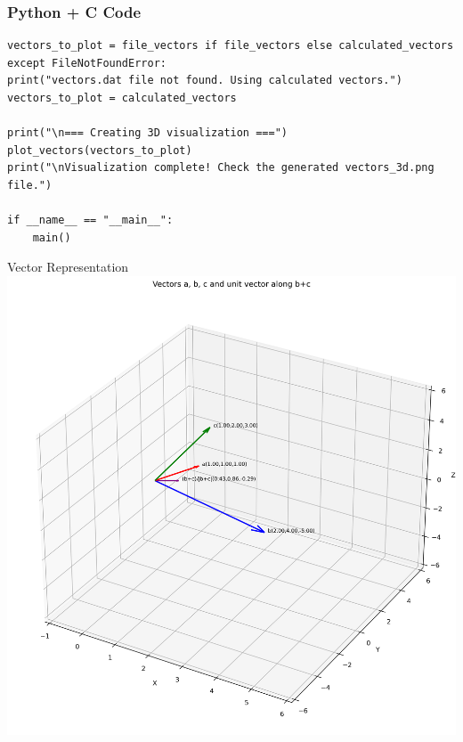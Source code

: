 \documentclass{beamer}
\begin{document}
\begin{frame}[fragile]
    \frametitle{Python + C Code}
    \begin{lstlisting}
vectors_to_plot = file_vectors if file_vectors else calculated_vectors
except FileNotFoundError:
print("vectors.dat file not found. Using calculated vectors.")
vectors_to_plot = calculated_vectors

print("\n=== Creating 3D visualization ===")
plot_vectors(vectors_to_plot)
print("\nVisualization complete! Check the generated vectors_3d.png file.")

if __name__ == "__main__":
    main()
    \end{lstlisting}
\end{frame}


\begin{frame}{Vector Representation}
   \centering
    \includegraphics[width=\columnwidth, height=0.8\textheight, keepaspectratio]{figs/fig1.png}
    \label{fig:Beamer/figs/fig1.png}
\end{frame}
\end{document}
